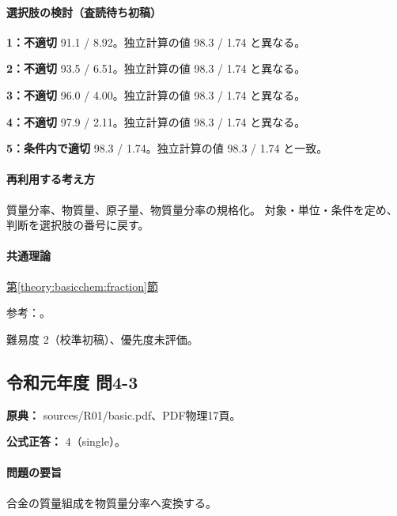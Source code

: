 \paragraph{選択肢の検討（査読待ち初稿）}\mbox{}\par

\noindent\textbf{1：不適切} 91.1 / 8.92。独立計算の値 98.3 / 1.74 と異なる。\par

\noindent\textbf{2：不適切} 93.5 / 6.51。独立計算の値 98.3 / 1.74 と異なる。\par

\noindent\textbf{3：不適切} 96.0 / 4.00。独立計算の値 98.3 / 1.74 と異なる。\par

\noindent\textbf{4：不適切} 97.9 / 2.11。独立計算の値 98.3 / 1.74 と異なる。\par

\noindent\textbf{5：条件内で適切} 98.3 / 1.74。独立計算の値 98.3 / 1.74 と一致。\par

\paragraph{再利用する考え方} 質量分率、物質量、原子量、物質量分率の規格化。 対象・単位・条件を定め、判断を選択肢の番号に戻す。

\paragraph{共通理論} \hyperref[theory:basicchem:fraction]{第\ref*{theory:basicchem:fraction}節}

\par 参考：\cite{iupac_amount_fraction}。

\par 難易度 2（校準初稿）、優先度未評価。

\subsection{令和元年度 問4-3}
\label{q:r01-reg-basic-4-3}

\noindent\textbf{原典：} sources/R01/basic.pdf、PDF物理17頁。

\textbf{公式正答：} 4（single）。

\paragraph{問題の要旨} 合金の質量組成を物質量分率へ変換する。

